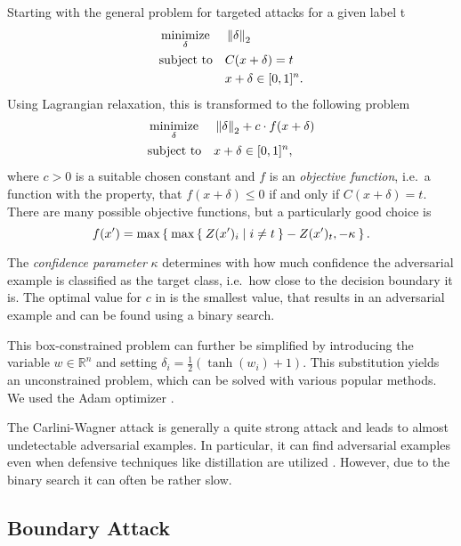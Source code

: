 Starting with the general problem for targeted attacks for a given label t
\begin{equation}
\begin{aligned}
& \operatorname*{minimize}_{\delta} && \left \lVert \delta \right \rVert _{2} \\
& \text{subject to} && C(x + \delta) = t \\
& && x + \delta \in [0,1]^n .
\end{aligned}
\end{equation}
Using Lagrangian relaxation, this is transformed to the following problem
\begin{equation}
\label{eq:cwproblem}
\begin{aligned}
& \operatorname*{minimize}_{\delta} && \left \lVert \delta \right \rVert _{2} + c \cdot f(x + \delta)\\
& \text{subject to} && x + \delta \in [0,1]^n ,
\end{aligned}
\end{equation}
where $c > 0$ is a suitable chosen constant and $f$ is an \emph{objective function}, i.e.\ a function with the property, that
$f(x + \delta) \leq 0$ if and only if $C(x + \delta) = t$.
There are many possible objective functions, but a particularly good choice is
\begin{equation}
\label{eq:cwobjective}
f(x') = \max \Set{ \max \Set{Z(x')_i | i \neq t } - Z(x')_t, -\kappa } .
\end{equation}%

The \emph{confidence parameter} $\kappa$ determines with how much confidence the adversarial example is classified as the target class, i.e.\ how close to the decision boundary it is.
The optimal value for $c$ in  is the smallest value, that results in an adversarial example and can be found using a binary search.

This box-constrained problem can further be simplified by introducing the variable $w \in \mathbb{R}^n$ and setting $\delta_i = \frac{1}{2} (\tanh(w_i) + 1)$.
This substitution yields an unconstrained problem, which can be solved with various popular methods. We used the Adam optimizer \citep{adam}.

The Carlini-Wagner attack is generally a quite strong attack and leads to almost undetectable adversarial examples.
In particular, it can find adversarial examples even when defensive techniques like distillation are utilized \citep{carlini}.
However, due to the binary search it can often be rather slow.

\subsection{Boundary Attack}

